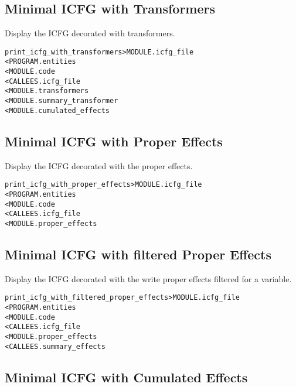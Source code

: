 \documentclass[a4paper]{report}
\newenvironment{PipsMake}{\begin{alltt}}{\end{alltt}}
\newenvironment{PipsPass}[1]{\label{pass:#1}}{}
\begin{document}
\subsection{Minimal ICFG with Transformers}

\begin{PipsPass}{print_icfg_with_transformers}
Display the ICFG decorated with transformers.
\end{PipsPass}
\begin{PipsMake}
print_icfg_with_transformers             > MODULE.icfg_file
        < PROGRAM.entities
        < MODULE.code
        < CALLEES.icfg_file
        < MODULE.transformers
        < MODULE.summary_transformer
        < MODULE.cumulated_effects
\end{PipsMake}

\subsection{Minimal ICFG with Proper Effects}

\begin{PipsPass}{print_icfg_with_proper_effects}
Display the ICFG decorated with the proper effects.
\end{PipsPass}
\begin{PipsMake}
print_icfg_with_proper_effects           > MODULE.icfg_file
        < PROGRAM.entities
        < MODULE.code
        < CALLEES.icfg_file
        < MODULE.proper_effects
\end{PipsMake}

\subsection{Minimal ICFG with filtered Proper Effects}
\begin{PipsPass}{print_icfg_with_filtered_proper_effects}
Display the ICFG decorated with the write proper effects filtered for a variable.
\end{PipsPass}
\begin{PipsMake}
print_icfg_with_filtered_proper_effects           > MODULE.icfg_file
        < PROGRAM.entities
        < MODULE.code
        < CALLEES.icfg_file
        < MODULE.proper_effects
        < CALLEES.summary_effects
\end{PipsMake}

\subsection{Minimal ICFG with Cumulated Effects}
\end{document}
